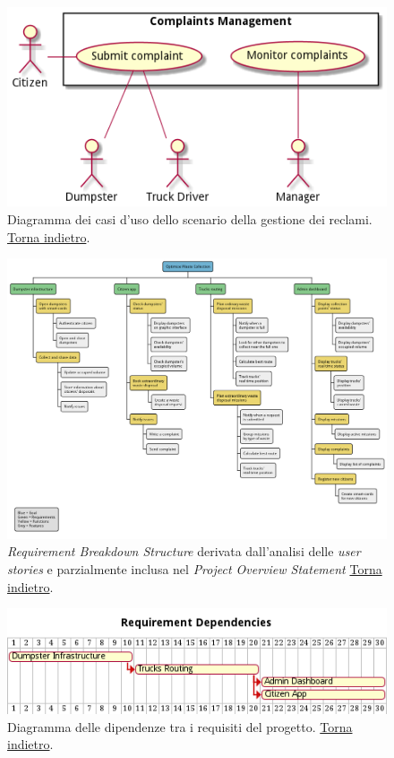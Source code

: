 \begin{figure}[H]
    \centering
    \includegraphics[width=\textwidth]{img/complaints-use-cases.pm}
    \caption{Diagramma dei casi d'uso dello scenario della gestione dei reclami. \hyperlink{back:complaints-use-cases}{Torna indietro}.}
    \label{fig:complaints-use-cases}
\end{figure}

\begin{figure}[H]
    \centering
    \includegraphics[width=\textwidth]{img/requirement-breakdown-structure.pm}
    \caption{\textit{Requirement Breakdown Structure} derivata dall'analisi delle \textit{user stories} e parzialmente inclusa nel \textit{Project Overview Statement}   \hyperlink{back:requirement-breakdown-structure}{Torna indietro}.}
    \label{fig:requirement-breakdown-structure}
\end{figure}

\begin{figure}[H]
    \centering
    \includegraphics[width=\textwidth]{img/gantt-requirements-dependencies.pm}
    \caption{Diagramma delle dipendenze tra i requisiti del progetto. \hyperlink{back:gantt-requirements-dependencies}{Torna indietro}.}
    \label{fig:gantt-requirements-dependencies}
\end{figure}


